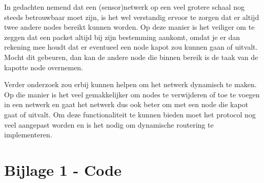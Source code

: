 \documentclass[a4paper,10pt]{article}
\begin{document}
In gedachten nemend dat een (sensor)netwerk op een veel grotere schaal nog steeds betrouwbaar moet zijn, is het wel verstandig ervoor te zorgen dat er altijd twee andere nodes bereikt kunnen worden. Op deze manier is het veiliger om te zeggen dat een packet altijd bij zijn bestemming aankomt, omdat je er dan rekening mee houdt dat er eventueel een node kapot zou kunnen gaan of uitvalt. Mocht dit gebeuren, dan kan de andere node die binnen bereik is de taak van de kapotte node overnemen.

Verder onderzoek zou erbij kunnen helpen om het netwerk dynamisch te maken. Op die manier is het veel gemakkelijker om nodes te verwijderen of toe te voegen in een netwerk en gaat het netwerk dus ook beter om met een node die kapot gaat of uitvalt. Om deze functionaliteit te kunnen bieden moet het protocol nog veel aangepast worden en is het nodig om dynamische routering te implementeren.

\newpage
\appendix
\section{Bijlage 1 - Code}
\label{sec:code}

\end{document}
